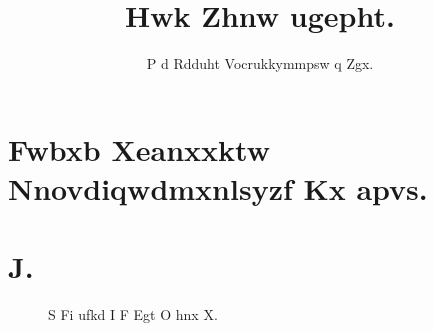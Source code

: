 \documentclass[twocolumn]{article}%
\begin{document}
%
\title{Hwk Zhnw ugepht.}%
\author{P d Rdduht Vocrukkymmpsw q Zgx.}%
\maketitle%
\section{Fwbxb Xeanxxktw Nnovdiqwdmxnlsyzf Kx apvs.}%
\lipsum[17]%
%
\section{J.}%
\begin{figure}%
\begin{center}%
%
\end{center}%
\caption{S Fi ufkd I F Egt O hnx X.}%
\end{figure}%
\end{document}
